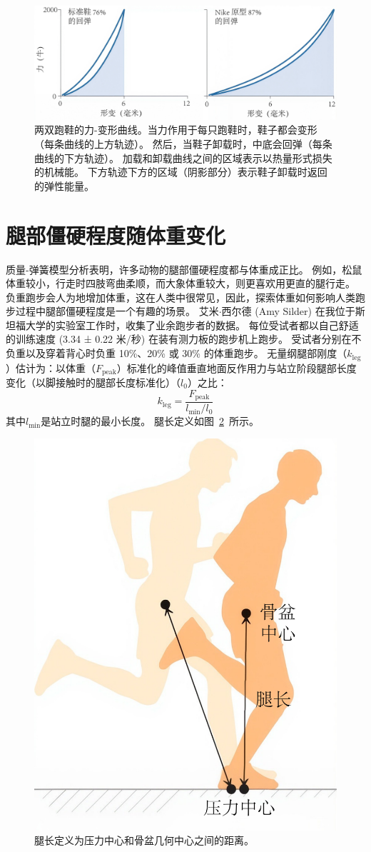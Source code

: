 \begin{figure}[!htb]
	\centering
	\includegraphics[width=1.0\linewidth]{chap3/3_14}
	\caption{两双跑鞋的力-变形曲线。当力作用于每只跑鞋时，鞋子都会变形（每条曲线的上方轨迹）。
		然后，当鞋子卸载时，中底会回弹（每条曲线的下方轨迹）。
		加载和卸载曲线之间的区域表示以热量形式损失的机械能。
		下方轨迹下方的区域（阴影部分）表示鞋子卸载时返回的弹性能量\cite{hoogkamer2018comparison}。 \label{fig:3_14}}
\end{figure}


\section{腿部僵硬程度随体重变化}

质量-弹簧模型分析表明，许多动物的腿部僵硬程度都与体重成正比\cite{farley1993running}。
例如，松鼠体重较小，行走时四肢弯曲柔顺，而大象体重较大，则更喜欢用更直的腿行走。
负重跑步会人为地增加体重，这在人类中很常见，因此，探索体重如何影响人类跑步过程中腿部僵硬程度是一个有趣的场景。
艾米$\cdot$西尔德 (Amy Silder) 在我位于斯坦福大学的实验室工作时，收集了业余跑步者的数据。
每位受试者都以自己舒适的训练速度 (3.34 ± 0.22 米/秒) 在装有测力板的跑步机上跑步。
受试者分别在不负重以及穿着背心时负重 10\%、20\% 或 30\% 的体重跑步。
无量纲腿部刚度（$k_\text{leg}$）估计为：以体重（$F_\text{peak}$）标准化的峰值垂直地面反作用力与站立阶段腿部长度变化（以脚接触时的腿部长度标准化）（$l_0$）之比：
%
\begin{equation}
	k_\text{leg} = \frac{F_\text{peak}}{l_\text{min} / l_0 }
\end{equation}
%
其中$l_\text{min}$是站立时腿的最小长度。
腿长定义如图~\ref{fig:3_15}~所示。

\begin{figure}[!htb]
	\centering
	\includegraphics[width=0.4\linewidth]{chap3/3_15}
	\caption{腿长定义为压力中心和骨盆几何中心之间的距离。 \label{fig:3_15}}
\end{figure}

